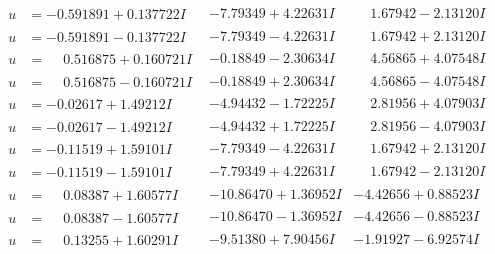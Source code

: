 \documentclass[1p]{elsarticle_modified}
\theoremstyle{definition}
\begin{document}
$$\begin{array}{c|c|c}
\begin{aligned}
u &= -0.591891 + 0.137722 I\end{aligned}
 & -7.79349 + 4.22631 I & \phantom{-}1.67942 - 2.13120 I \\ \hline\begin{aligned}
u &= -0.591891 - 0.137722 I\end{aligned}
 & -7.79349 - 4.22631 I & \phantom{-}1.67942 + 2.13120 I \\ \hline\begin{aligned}
u &= \phantom{-}0.516875 + 0.160721 I\end{aligned}
 & -0.18849 - 2.30634 I & \phantom{-}4.56865 + 4.07548 I \\ \hline\begin{aligned}
u &= \phantom{-}0.516875 - 0.160721 I\end{aligned}
 & -0.18849 + 2.30634 I & \phantom{-}4.56865 - 4.07548 I \\ \hline\begin{aligned}
u &= -0.02617 + 1.49212 I\end{aligned}
 & -4.94432 - 1.72225 I & \phantom{-}2.81956 + 4.07903 I \\ \hline\begin{aligned}
u &= -0.02617 - 1.49212 I\end{aligned}
 & -4.94432 + 1.72225 I & \phantom{-}2.81956 - 4.07903 I \\ \hline\begin{aligned}
u &= -0.11519 + 1.59101 I\end{aligned}
 & -7.79349 - 4.22631 I & \phantom{-}1.67942 + 2.13120 I \\ \hline\begin{aligned}
u &= -0.11519 - 1.59101 I\end{aligned}
 & -7.79349 + 4.22631 I & \phantom{-}1.67942 - 2.13120 I \\ \hline\begin{aligned}
u &= \phantom{-}0.08387 + 1.60577 I\end{aligned}
 & -10.86470 + 1.36952 I & -4.42656 + 0.88523 I \\ \hline\begin{aligned}
u &= \phantom{-}0.08387 - 1.60577 I\end{aligned}
 & -10.86470 - 1.36952 I & -4.42656 - 0.88523 I \\ \hline\begin{aligned}
u &= \phantom{-}0.13255 + 1.60291 I\end{aligned}
 & -9.51380 + 7.90456 I & -1.91927 - 6.92574 I \\ \hline\begin{aligned}

\end{aligned}
\end{array}$$
\end{document}
